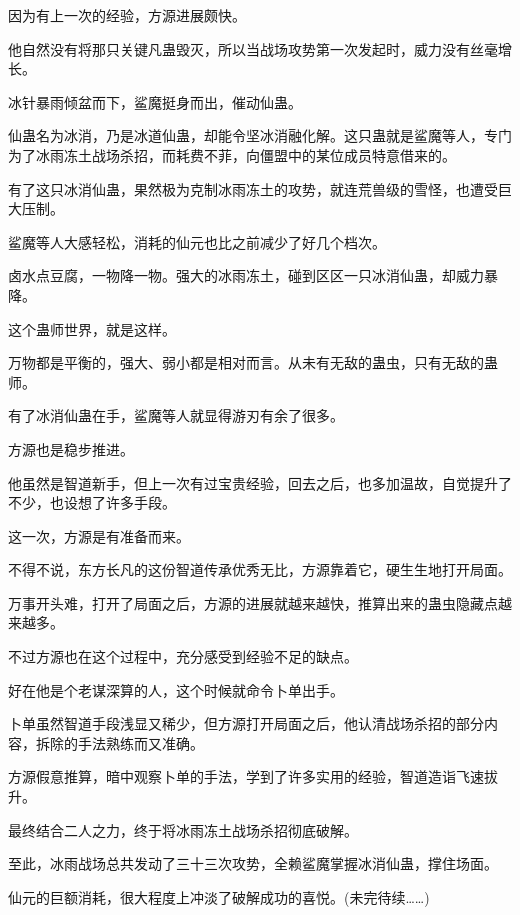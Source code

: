 \begin{this_body}
因为有上一次的经验，方源进展颇快。

他自然没有将那只关键凡蛊毁灭，所以当战场攻势第一次发起时，威力没有丝毫增长。

冰针暴雨倾盆而下，鲨魔挺身而出，催动仙蛊。

仙蛊名为冰消，乃是冰道仙蛊，却能令坚冰消融化解。这只蛊就是鲨魔等人，专门为了冰雨冻土战场杀招，而耗费不菲，向僵盟中的某位成员特意借来的。

有了这只冰消仙蛊，果然极为克制冰雨冻土的攻势，就连荒兽级的雪怪，也遭受巨大压制。

鲨魔等人大感轻松，消耗的仙元也比之前减少了好几个档次。

卤水点豆腐，一物降一物。强大的冰雨冻土，碰到区区一只冰消仙蛊，却威力暴降。

这个蛊师世界，就是这样。

万物都是平衡的，强大、弱小都是相对而言。从未有无敌的蛊虫，只有无敌的蛊师。

有了冰消仙蛊在手，鲨魔等人就显得游刃有余了很多。

方源也是稳步推进。

他虽然是智道新手，但上一次有过宝贵经验，回去之后，也多加温故，自觉提升了不少，也设想了许多手段。

这一次，方源是有准备而来。

不得不说，东方长凡的这份智道传承优秀无比，方源靠着它，硬生生地打开局面。

万事开头难，打开了局面之后，方源的进展就越来越快，推算出来的蛊虫隐藏点越来越多。

不过方源也在这个过程中，充分感受到经验不足的缺点。

好在他是个老谋深算的人，这个时候就命令卜单出手。

卜单虽然智道手段浅显又稀少，但方源打开局面之后，他认清战场杀招的部分内容，拆除的手法熟练而又准确。

方源假意推算，暗中观察卜单的手法，学到了许多实用的经验，智道造诣飞速拔升。

最终结合二人之力，终于将冰雨冻土战场杀招彻底破解。

至此，冰雨战场总共发动了三十三次攻势，全赖鲨魔掌握冰消仙蛊，撑住场面。

仙元的巨额消耗，很大程度上冲淡了破解成功的喜悦。(未完待续……)

\end{this_body}

